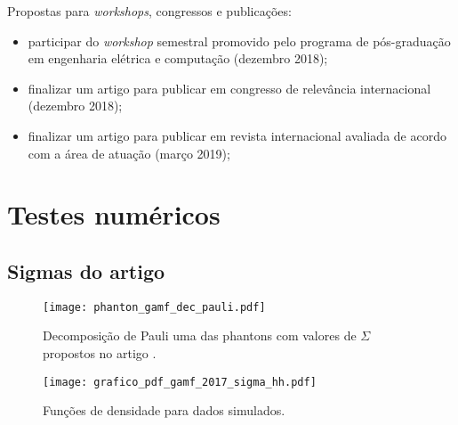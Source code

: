 Propostas para \textit{workshops}, congressos e publicações:
\begin{itemize}
\item participar do \textit{workshop} semestral promovido pelo programa de pós-graduação em engenharia elétrica e computação (dezembro 2018);
\item finalizar um artigo para publicar em congresso de relevância internacional (dezembro 2018);
\item finalizar um artigo para publicar em revista internacional avaliada de acordo com a área de atuação (março 2019);
\end{itemize}
\chapter{Testes numéricos}
\section{Sigmas do artigo }
\begin{figure}[hbt]
\centering
	\texttt{[image: phanton\_gamf\_dec\_pauli.pdf]}
	\caption{Decomposição de Pauli uma das phantons com valores de $\Sigma$ propostos no artigo \citep{gamf}.}\label{cap_acf_fig01}
\end{figure}
\begin{figure}[hbt]
	\centering
	\texttt{[image: grafico\_pdf\_gamf\_2017\_sigma\_hh.pdf]}
	\caption{Funções de densidade para dados simulados.}\label{cap_acf_fig02}
\end{figure}

